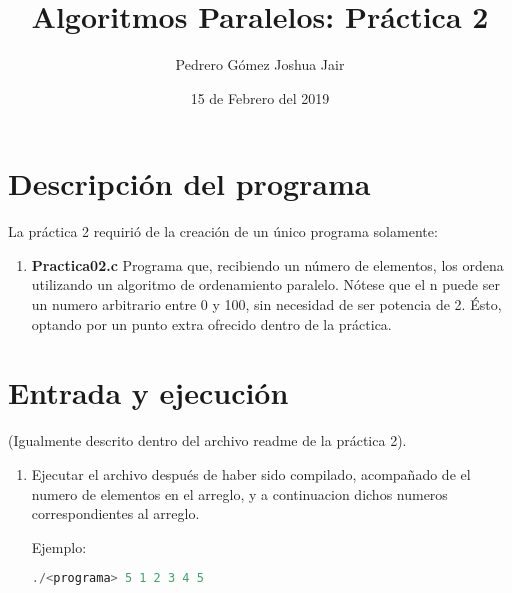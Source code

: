 \documentclass{article}
\title{Algoritmos Paralelos: Práctica 2}
\author{Pedrero Gómez Joshua Jair}
\date{15 de Febrero del 2019}
\begin{document}
\maketitle

\section{Descripción del programa}

La práctica 2 requirió de la creación de un único programa solamente:

\begin{enumerate}
	\item {\bf Practica02.c} \linebreak
	Programa que, recibiendo un número de elementos, los ordena utilizando un algoritmo de ordenamiento paralelo.
	Nótese que el n puede ser un numero arbitrario entre 0 y 100, sin necesidad de ser potencia de 2. Ésto, optando por un punto extra ofrecido dentro de la práctica.
\end{enumerate}

\section{Entrada y ejecución}

(Igualmente descrito dentro del archivo readme de la práctica 2).

\begin{enumerate}
	\item Ejecutar el archivo después de haber sido compilado, acompañado de el numero de elementos
	en el arreglo, y a continuacion dichos numeros correspondientes al arreglo.
	
	Ejemplo: 
	
	\begin{lstlisting}[language=c]
	./<programa> 5 1 2 3 4 5
	\end{lstlisting}
\end{enumerate}
\end{document}
